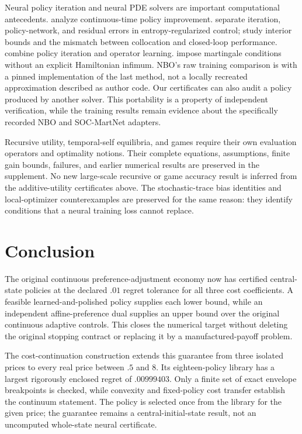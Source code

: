 Neural policy iteration and neural PDE solvers are important computational antecedents. \citet{jacka2015} analyze continuous-time policy improvement. \citet{kim2026explore} separate iteration, policy-network, and residual errors in entropy-regularized control; \citet{kim2026interior} study interior bounds and the mismatch between collocation and closed-loop performance. \citet{lee2025} combine policy iteration and operator learning. \citet{cai2025published} impose martingale conditions without an explicit Hamiltonian infimum. NBO's raw training comparison is with a pinned implementation of the last method, not a locally recreated approximation described as author code. Our certificates can also audit a policy produced by another solver. This portability is a property of independent verification, while the training results remain evidence about the specifically recorded NBO and SOC-MartNet adapters.

Recursive utility, temporal-self equilibria, and games require their own evaluation operators and optimality notions. Their complete equations, assumptions, finite gain bounds, failures, and earlier numerical results are preserved in the supplement. No new large-scale recursive or game accuracy result is inferred from the additive-utility certificates above. The stochastic-trace bias identities and local-optimizer counterexamples are preserved for the same reason: they identify conditions that a neural training loss cannot replace.

\section{Conclusion}
The original continuous preference-adjustment economy now has certified central-state policies at the declared $.01$ regret tolerance for all three cost coefficients. A feasible learned-and-polished policy supplies each lower bound, while an independent affine-preference dual supplies an upper bound over the original continuous adaptive controls. This closes the numerical target without deleting the original stopping contract or replacing it by a manufactured-payoff problem.

The cost-continuation construction extends this guarantee from three isolated prices to every real price between $.5$ and $8$. Its eighteen-policy library has a largest rigorously enclosed regret of $.00999403$. Only a finite set of exact envelope breakpoints is checked, while convexity and fixed-policy cost transfer establish the continuum statement. The policy is selected once from the library for the given price; the guarantee remains a central-initial-state result, not an uncomputed whole-state neural certificate.

